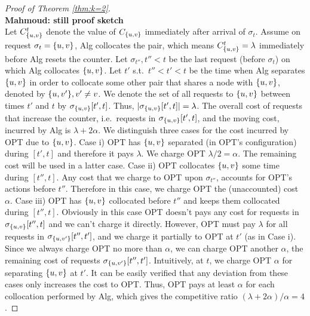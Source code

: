 \documentclass[manuscript,screen=true, review, anonymous]{acmart}
\DeclarePairedDelimiter\set{\{}{\}}
\newcommand\mahmoud[1]{\color{green}\textbf{\\ Mahmoud: #1}\\\color{black}}
\begin{document}
\begin{proof}[Proof of Theorem \ref{thm:k=2}]
	\mahmoud{still proof sketch}
	Let $C^{t}_{\set{u,v}}$ denote the  value of $C_{\set{u,v}}$ immediately after arrival of $\sigma_t$.
	Assume on request $\sigma_{t}=\set{u,v}$,
	Alg collocates the pair,
	which means $ C^t_{\set{u,v}} = \lambda$ immediately before Alg resets the counter.
	Let $\sigma_{t''}, t''<t$ be the last request (before $\sigma_{t}$)
	on which Alg collocates $\set{u,v}$.
	Let $t'$ s.t.~$t'' < t' < t$ be the  time when Alg separates $\set{u,v}$
	in order to collocate some other pair that shares a node with $\set{u,v}$,
	denoted by $\set{u,v'}, v' \neq v$.
	We denote the set of all requests to $\set{u,v}$
	between times $t'$ and $t$ by $\sigma_{\set{u,v}}[t',t]$.
	Thus,
	$| \sigma_{\set{u,v}}[t',t] | = \lambda$.
	The overall cost of requests that increase the counter,
	i.e.~requests in $\sigma_{\set{u,v}}[t',t]$,
	and the moving cost,
	incurred by Alg is $\lambda + 2\alpha$.
	We distinguish three cases for the cost incurred by OPT due to $\set{u,v}$.
	Case i)
	OPT has $\set{u,v}$ separated (in OPT's configuration) during $[t',t]$
	and therefore it pays $\lambda$.
	We charge OPT $\lambda/2 = \alpha$.
	The remaining cost will be used in a latter case.
	Case ii)  
	OPT collocates $\set{u,v}$ some time during $[t'',t]$.
	Any cost that we charge to OPT upon $\sigma_{t''}$,
	accounts for OPT's actions before $t''$.
	Therefore in this case,
	we charge OPT the (unaccounted) cost $\alpha$.
	Case iii)
	OPT has $\set{u,v}$ collocated before $t''$ and keeps them collocated during $[t'',t]$.
	Obviously in this case OPT doesn't pays any cost for requests in $\sigma_{\set{u,v}}[t'',t]$ and
	we can't charge it directly.
	However,
	OPT must pay $\lambda$ for all requests in $\sigma_{\set{u,v'}}[t'',t']$,
	and we charge it partially to OPT at $t'$ (as in Case i).
	Since we always charge OPT no more than $\alpha$,
	we can charge OPT another $\alpha$,
	the remaining cost of requests $\sigma_{\set{u,v'}}[t'',t']$.
	Intuitively,
	at $t$,
	we charge OPT $\alpha$ for separating $\set{u,v}$ at $t'$.
	It can be easily verified that any deviation from these cases only increases the cost to OPT.
	Thus,
	OPT pays at least $\alpha$ for each collocation performed by Alg,
	which gives the competitive ratio 
	$(\lambda + 2\alpha)/ \alpha = 4$.
	

\end{proof}
\end{document}
